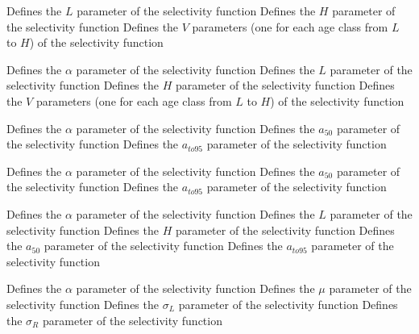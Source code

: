 \par\textbf{}\par
{} {Defines the $L$ parameter of the selectivity function}
 {Defines the $H$ parameter of the selectivity function}
 {Defines the $V$ parameters (one for each age class from $L$ to $H$) of the selectivity function}
\par\textbf{}\par
{} {Defines the $\alpha$ parameter of the selectivity function}
 {Defines the $L$ parameter of the selectivity function}
 {Defines the $H$ parameter of the selectivity function}
 {Defines the $V$ parameters (one for each age class from $L$ to $H$) of the selectivity function}
\par\textbf{}\par
{} {Defines the $\alpha$ parameter of the selectivity function}
 {Defines the $a_{50}$ parameter of the selectivity function}
 {Defines the $a_{to95}$ parameter of the selectivity function}
\par\textbf{}\par
{} {Defines the $\alpha$ parameter of the selectivity function}
 {Defines the $a_{50}$ parameter of the selectivity function}
 {Defines the $a_{to95}$ parameter of the selectivity function}
\par\textbf{}\par
{} {Defines the $\alpha$ parameter of the selectivity function}
 {Defines the $L$ parameter of the selectivity function}
 {Defines the $H$ parameter of the selectivity function}
 {Defines the $a_{50}$ parameter of the selectivity function}
 {Defines the $a_{to95}$ parameter of the selectivity function}
\par\textbf{}\par
{} {Defines the $\alpha$ parameter of the selectivity function}
 {Defines the $\mu$ parameter of the selectivity function}
 {Defines the $\sigma_L$ parameter of the selectivity function}
 {Defines the $\sigma_R$ parameter of the selectivity function}
\par\textbf{}\par
